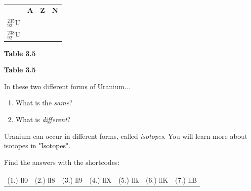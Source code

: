 \begin{enumerate}[noitemsep, label=\textbf{\arabic*}. ]
\begin{table}[H]
\begin{center}
{        \hline
      }
      \tablelasttail{}
      \begin{xtabular}[t]{|l|l|l|l|}\hline
         &
        \textbf{A} &
        \textbf{Z} &
        \textbf{N}%
     \tabularnewline{}
        $_{92}^{235}\mathrm{U}$ &
         &
         &
     \tabularnewline{}
        $_{92}^{238}\mathrm{U}$ &
         &
         &
     \tabularnewline{}
    \end{xtabular}
      \end{center}
    \begin{center}{\small\bfseries Table 3.5}\end{center}
    \begin{caption}{\small\bfseries Table 3.5}\end{caption}
\end{table}
    \par
In these two different forms of Uranium...
\label{m38745*id257277}\begin{enumerate}[noitemsep, label=\textbf{\alph*}. ] 
            \label{m38745*uid38}\item What is the \textsl{same}?
\label{m38745*uid39}\item What is \textsl{different}?
\end{enumerate}
Uranium can occur in different forms, called \textsl{isotopes}. You will learn more about isotopes in "Isotopes".\newline
\end{enumerate}
  \label{m38745**end}
\par {} Find the answers with the shortcodes:
 \par \begin{tabular}[h]{cccccc}
 (1.) ll0  &  (2.) ll8  &  (3.) ll9  &  (4.) llX  &  (5.) llk  &  (6.) llK  &  (7.) llB  & \end{tabular}

